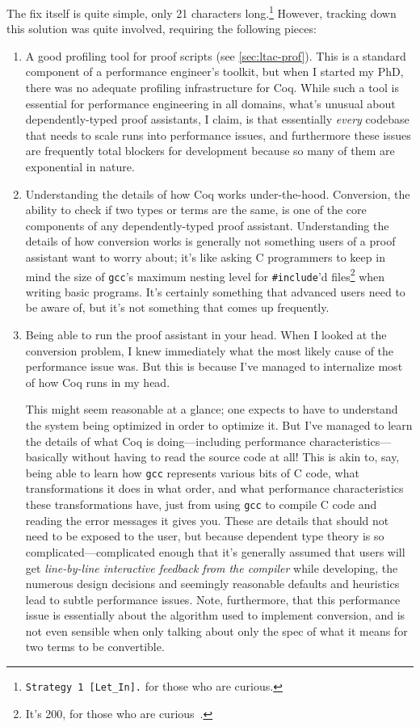 The fix itself is quite simple, only 21 characters long.\footnote{\texttt{Strategy 1 [Let\_In].} for those who are curious.}
However, tracking down this solution was quite involved, requiring the following pieces:
\begin{enumerate}
  \item
    A good profiling tool for proof scripts (see \autoref{sec:ltac-prof}).
    This is a standard component of a performance engineer's toolkit, but when I started my PhD, there was no adequate profiling infrastructure for Coq.
    While such a tool is essential for performance engineering in all domains, what's unusual about dependently-typed proof assistants, I claim, is that essentially \emph{every} codebase that needs to scale runs into performance issues, and furthermore these issues are frequently total blockers for development because so many of them are exponential in nature.
  \item
    Understanding the details of how Coq works under-the-hood.
    Conversion, the ability to check if two types or terms are the same, is one of the core components of any dependently-typed proof assistant.
    Understanding the details of how conversion works is generally not something users of a proof assistant want to worry about; it's like asking C programmers to keep in mind the size of \texttt{gcc}'s maximum nesting level for \texttt{\#include}'d files\footnote{It's 200, for those who are curious~\cite{C2017FSF}.} when writing basic programs.
    It's certainly something that advanced users need to be aware of, but it's not something that comes up frequently.
  \item
    Being able to run the proof assistant in your head.
    When I looked at the conversion problem, I knew immediately what the most likely cause of the performance issue was.
    But this is because I've managed to internalize most of how Coq runs in my head.

    This might seem reasonable at a glance; one expects to have to understand the system being optimized in order to optimize it.
    But I've managed to learn the details of what Coq is doing---including performance characteristics---basically without having to read the source code at all!
    This is akin to, say, being able to learn how \texttt{gcc} represents various bits of C code, what transformations it does in what order, and what performance characteristics these transformations have, just from using \texttt{gcc} to compile C code and reading the error messages it gives you.
    These are details that should not need to be exposed to the user, but because dependent type theory is so complicated---complicated enough that it's generally assumed that users will get \emph{line-by-line interactive feedback from the compiler} while developing, the numerous design decisions and seemingly reasonable defaults and heuristics lead to subtle performance issues.
    Note, furthermore, that this performance issue is essentially about the algorithm used to implement conversion, and is not even sensible when only talking about only the spec of what it means for two terms to be convertible.


\end{enumerate}
